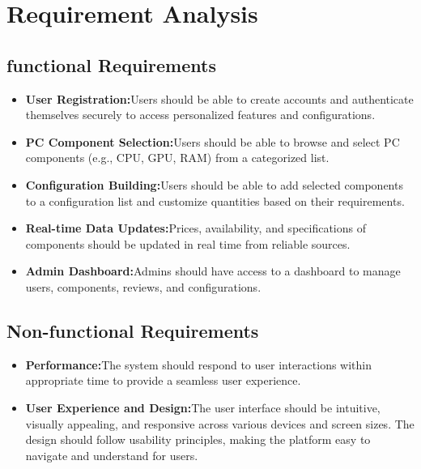 \section{Requirement Analysis}
\subsection{functional Requirements}
\begin{itemize}
   \item \textbf{User Registration:}Users should be able to create accounts and authenticate themselves securely to access personalized features and configurations.
   \item \textbf{PC Component Selection:}Users should be able to browse and select PC components (e.g., CPU, GPU, RAM) from a categorized list.
   \item \textbf{Configuration Building:}Users should be able to add selected components to a configuration list and customize quantities based on their requirements.
   \item \textbf{Real-time Data Updates:}Prices, availability, and specifications of components should be updated in real time from reliable sources.
   \item \textbf{Admin Dashboard:}Admins should have access to a dashboard to manage users, components, reviews, and configurations.
\end{itemize}
\subsection{Non-functional Requirements}
\begin{itemize}
   \item \textbf{Performance:}The system should respond to user interactions within appropriate time to provide a seamless user experience.
   \item \textbf{User Experience and Design:}The user interface should be intuitive, visually appealing, and responsive across various devices and screen sizes.
   The design should follow usability principles, making the platform easy to navigate and understand for users.
\end{itemize}

